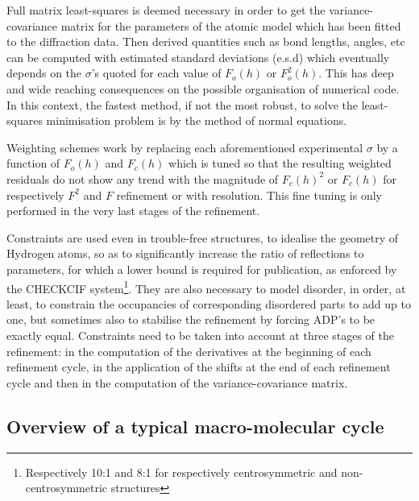 \documentclass[12pt]{article}
\begin{document}
Full matrix least-squares is deemed necessary in order to get the variance-covariance matrix for the parameters of the atomic model which has been fitted to the diffraction data. Then derived quantities such as bond lengths, angles, etc can be computed with estimated standard deviations (e.s.d) which eventually depends on the $\sigma$'s quoted for each value of $F_o(h)$ or $F_o^2(h)$. This has deep and wide reaching consequences on the possible organisation of numerical code. In this context, the fastest method, if not the most robust, to solve the least-squares minimisation problem is by the method of normal equations.

Weighting schemes work by replacing each aforementioned experimental $\sigma$ by a function of $F_o(h)$ and $F_c(h)$ which is tuned so that the resulting weighted residuals do not show any trend with the magnitude of $F_c(h)^2$ or $F_c(h)$ for respectively $F^2$ and $F$ refinement or with resolution. This fine tuning is only performed in the very last stages of the refinement.

Constraints are used even in trouble-free structures, to idealise the geometry of Hydrogen atoms, so as to significantly increase the ratio of reflections to parameters, for which a lower bound is required for publication, as enforced by the CHECKCIF system\footnote{Respectively 10:1 and 8:1 for respectively centrosymmetric and non-centrosymmetric structures}. They are also necessary to model disorder, in order, at least, to constrain the occupancies of corresponding disordered parts to add up to one, but sometimes also to stabilise the refinement by forcing ADP's to be exactly equal. Constraints need to be taken into account at three stages of the refinement: in the computation of the derivatives at the beginning of each refinement cycle, in the application of the shifts at the end of each refinement cycle and then in the computation of the variance-covariance matrix.

\subsection{Overview of a typical macro-molecular cycle}
\end{document}

